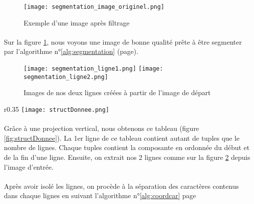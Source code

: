 \documentclass[a4paper]{article}
\begin{document}
			\begin{figure}
				\centering
				\texttt{[image: segmentation\_image\_originel.png]}
				\caption{Exemple d'une image après filtrage}
				\label{fig:imageOriginel}
			\end{figure}
			\paragraph{} Sur la figure \ref{fig:imageOriginel}, nous voyons une image de bonne qualité prête à être segmenter par l'algorithme n°\ref{alg:segmentation} (page\pageref{alg:segmentation}). 
			
			
			\begin{figure}
				\centering
				\texttt{[image: segmentation\_ligne1.png]}
				\texttt{[image: segmentation\_ligne2.png]}
				\caption{Images de nos deux lignes créées à partir de l'image de départ}
				\label{fig:imageLignes}
			\end{figure}
			
			
			\begin{wrapfigure}{r}{0.35\textwidth}
				\texttt{[image: structDonnee.png]}
				\caption{Structure de données dans l'algorithme SEGMENTATION}
				\label{fig:structDonnee}
			
			\end{wrapfigure}

			\paragraph{} Grâce à une projection vertical, nous obtenons ce tableau (figure \ref{fig:structDonnee}). La 1er ligne de ce tableau contient autant de tuples que le nombre de lignes. Chaque tuples contient la composante en ordonnée du début et de la fin d'une ligne. Ensuite, on extrait nos 2 lignes comme sur la figure \ref{fig:imageLignes} depuis l'image d'entrée.
			\paragraph{} Après avoir isolé les lignes, on procède à la séparation des caractères contenus dans chaque lignes en suivant l'algorithme n°\ref{alg:coordcar} page \pageref{alg:coordcar}
\end{document}
